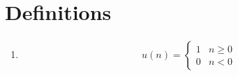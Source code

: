 \documentclass[journal,12pt,onecolumn]{IEEEtran}
\providecommand{\sbrak}[1]{\ensuremath{{}\left[#1\right]}}
\providecommand{\brak}[1]{\ensuremath{\left(#1\right)}}
\theoremstyle{remark}
\numberwithin{equation}{section}
\begin{document}
\section{Definitions}
\begin{enumerate}
%
\item 
	\begin{align}
u(n) =
\begin{cases}
1 & n \ge 0
\\
0 & n < 0
\end{cases}
\end{align}


\end{enumerate}
\end{document}
